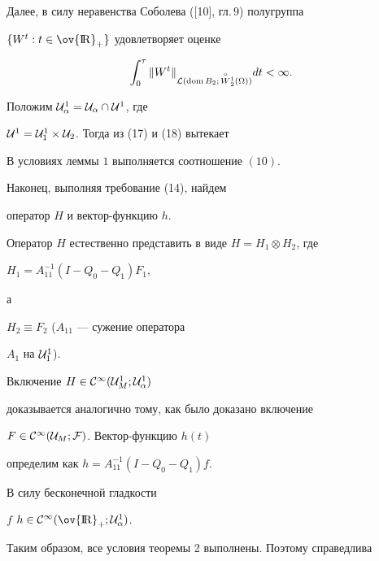 Далее, в силу неравенства Соболева ([10], гл.\,9) полугруппа


$\{W^t: t \in {\ov {\R}}_+\} $ удовлетворяет оценке


\begin{equation}


\int_0^{\tau} {\| W^t \|}_{{\cal L}


(\dom B_2;\,\up{\circ}{W}_2^1(\Omega))} dt < \infty.


\end{equation}


Положим ${\cal U}_{\alpha}^1={\cal U}_{\alpha} \cap {\cal U}^1$, где


${\cal U}^1={\cal U}_1^1 \times {\cal U}_2$. Тогда из (17) и (18) вытекает





\begin{lem}


В условиях леммы $1$ выполняется соотношение $(10)$.


\end{lem}





Наконец, выполняя требование (14), найдем


оператор $H$ и вектор-функцию $h$.


Оператор $H$ естественно представить в виде $H=H_1 \otimes H_2$, где


$H_1=A^{-1}_{11}(I-Q_0-Q_1)F_1$,


а


$H_2 \equiv F_2$ ($A_{11}$ --- сужение оператора


$A_1$ на ${\cal U}^1_1$).


Включение $H \in {\cal C}^{\infty}({\cal U}_M^1;{\cal U}_{\alpha}^1)$


доказывается аналогично тому, как было доказано включение


$F \in {\cal C}^{\infty}({\cal U}_M;{\cal F})$. Вектор-функцию $h(t)$


определим как $h=A_{11}^{-1}(I-Q_0-Q_1)f$.


В силу бесконечной гладкости


$f$\; $h\in {\cal C}^{\infty}({\ov {\R}}_+; {\cal U}_{\alpha}^1)$.





Таким образом, все условия теоремы 2 выполнены. Поэтому справедлива





